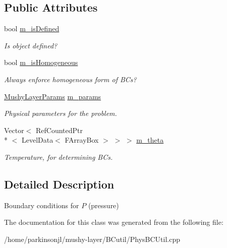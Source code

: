 \subsection*{Public Attributes}
\begin{DoxyCompactItemize}
\item 
\hypertarget{class_basic_pressure_b_c_function_a43356f3f0a9b5c53eb640704fa31164f}{bool \hyperlink{class_basic_pressure_b_c_function_a43356f3f0a9b5c53eb640704fa31164f}{m\-\_\-is\-Defined}}\label{class_basic_pressure_b_c_function_a43356f3f0a9b5c53eb640704fa31164f}

\begin{DoxyCompactList}\small\item\em Is object defined? \end{DoxyCompactList}\item 
\hypertarget{class_basic_pressure_b_c_function_aaa9abdedf2ccc38350fa36510a738f53}{bool \hyperlink{class_basic_pressure_b_c_function_aaa9abdedf2ccc38350fa36510a738f53}{m\-\_\-is\-Homogeneous}}\label{class_basic_pressure_b_c_function_aaa9abdedf2ccc38350fa36510a738f53}

\begin{DoxyCompactList}\small\item\em Always enforce homogeneous form of B\-Cs? \end{DoxyCompactList}\item 
\hypertarget{class_basic_pressure_b_c_function_a6330db574ca42615d78c4ddac98e4ccd}{\hyperlink{class_mushy_layer_params}{Mushy\-Layer\-Params} \hyperlink{class_basic_pressure_b_c_function_a6330db574ca42615d78c4ddac98e4ccd}{m\-\_\-params}}\label{class_basic_pressure_b_c_function_a6330db574ca42615d78c4ddac98e4ccd}

\begin{DoxyCompactList}\small\item\em Physical parameters for the problem. \end{DoxyCompactList}\item 
\hypertarget{class_basic_pressure_b_c_function_a232e0c7e4b9e41dd05a0cc4d33ac2920}{Vector$<$ Ref\-Counted\-Ptr\\*
$<$ Level\-Data$<$ F\-Array\-Box $>$ $>$ $>$ \hyperlink{class_basic_pressure_b_c_function_a232e0c7e4b9e41dd05a0cc4d33ac2920}{m\-\_\-theta}}\label{class_basic_pressure_b_c_function_a232e0c7e4b9e41dd05a0cc4d33ac2920}

\begin{DoxyCompactList}\small\item\em Temperature, for determining B\-Cs. \end{DoxyCompactList}\end{DoxyCompactItemize}


\subsection{Detailed Description}
Boundary conditions for $P$ (pressure) 

The documentation for this class was generated from the following file\-:\begin{DoxyCompactItemize}
\item 
/home/parkinsonjl/mushy-\/layer/\-B\-Cutil/Phys\-B\-C\-Util.\-cpp\end{DoxyCompactItemize}
